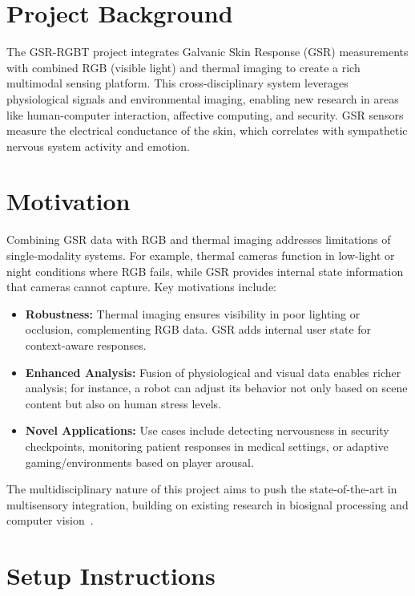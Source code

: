 \documentclass{article}
\begin{document}
    \section{Project Background}

    The GSR-RGBT project integrates Galvanic Skin Response (GSR) measurements with combined RGB (visible light) and thermal imaging to create a rich multimodal sensing platform. This cross-disciplinary system leverages physiological signals and environmental imaging, enabling new research in areas like human-computer interaction, affective computing, and security. GSR sensors measure the electrical conductance of the skin, which correlates with sympathetic nervous system activity and emotion.


    \section{Motivation}

    Combining GSR data with RGB and thermal imaging addresses limitations of single-modality systems. For example, thermal cameras function in low-light or night conditions where RGB fails, while GSR provides internal state information that cameras cannot capture. Key motivations include:

    \begin{itemize}
        \item \textbf{Robustness:} Thermal imaging ensures visibility in poor lighting or occlusion, complementing RGB data. GSR adds internal user state for context-aware responses.
        \item \textbf{Enhanced Analysis:} Fusion of physiological and visual data enables richer analysis; for instance, a robot can adjust its behavior not only based on scene content but also on human stress levels.
        \item \textbf{Novel Applications:} Use cases include detecting nervousness in security checkpoints, monitoring patient responses in medical settings, or adaptive gaming/environments based on player arousal.
    \end{itemize}

    The multidisciplinary nature of this project aims to push the state-of-the-art in multisensory integration, building on existing research in biosignal processing and computer vision~\cite{RefBackground}.


    \section{Setup Instructions}
\end{document}
